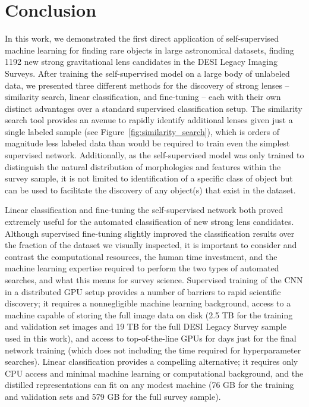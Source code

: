 \documentclass{aastex631}
\begin{document}
\section{Conclusion}
\label{sec:conclusions}

In this work, we demonstrated the first direct application of self-supervised machine learning for finding rare objects in large astronomical datasets, finding 1192 new strong gravitational lens candidates in the DESI Legacy Imaging Surveys. After training the self-supervised model on a large body of unlabeled data, we presented three different methods for the discovery of strong lenses -- similarity search, linear classification, and fine-tuning -- each with their own distinct advantages over a standard supervised classification setup. The similarity search tool provides an avenue to rapidly identify additional lenses given just a single labeled sample (see Figure~\ref{fig:similarity_search}), which is orders of magnitude less labeled data than would be required to train even the simplest supervised network. Additionally, as the self-supervised model was only trained to distinguish the natural distribution of morphologies and features within the survey sample, it is not limited to  identification of a  specific class of object but can be used to facilitate the discovery of any object(s) that exist in the dataset.

Linear classification and fine-tuning the self-supervised network both proved extremely useful for the automated classification of new strong lens candidates. Although supervised fine-tuning slightly improved the classification results over the fraction of the dataset we visually inspected, it is important to consider and contrast the computational resources, the human time investment, and the machine learning expertise required to perform the two types of automated searches, and what this means for survey science. Supervised training of the CNN in a distributed GPU setup provides a number of barriers to rapid scientific discovery; it requires a nonnegligible machine learning background, access to a machine capable of storing the full image data on disk (2.5 TB for the training and validation set images and 19 TB for the full DESI Legacy Survey sample used in this work), and access to top-of-the-line GPUs for days just for the final network training (which does not including the time required for hyperparameter searches). Linear classification provides a compelling alternative; it requires only CPU access and minimal machine learning or computational background, and the distilled representations can fit on any modest machine (76 GB for the training and validation sets and 579 GB for the full survey sample). 
\end{document}
